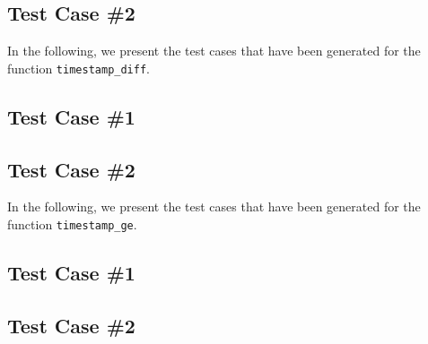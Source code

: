 \subsection{Test Case \#2}



In the following, we present the test cases that have been generated for the function \texttt{timestamp\_diff}.

\subsection{Test Case \#1}


\subsection{Test Case \#2}




In the following, we present the test cases that have been generated for the function \texttt{timestamp\_ge}.

\subsection{Test Case \#1}


\subsection{Test Case \#2}



